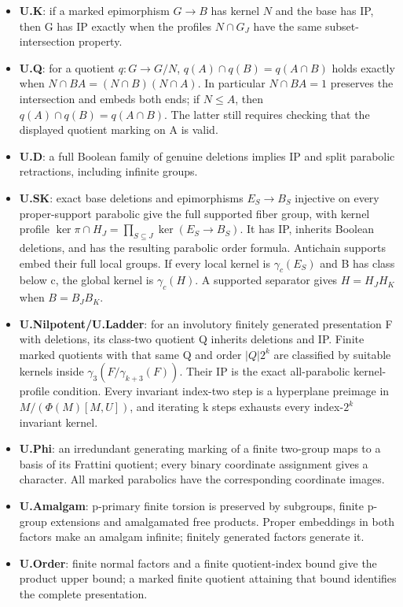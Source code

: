 \documentclass[
  11pt,
  a4paper,
]{article}
\providecommand{\tightlist}{%
  \setlength{\itemsep}{0pt}\setlength{\parskip}{0pt}}
\begin{document}
\begin{itemize}
\tightlist
\item
  \textbf{U.K}: if a marked epimorphism \(G\to B\) has kernel \(N\) and
  the base has IP, then G has IP exactly when the profiles \(N\cap G_J\)
  have the same subset-intersection property.
\item
  \textbf{U.Q}: for a quotient \(q:G\to G/N\),
  \(q(A)\cap q(B)=q(A\cap B)\) holds exactly when
  \(N\cap BA=(N\cap B)(N\cap A)\). In particular \(N\cap BA=1\)
  preserves the intersection and embeds both ends; if \(N\le A\), then
  \(q(A)\cap q(B)=q(A\cap B)\). The latter still requires checking that
  the displayed quotient marking on A is valid.
\item
  \textbf{U.D}: a full Boolean family of genuine deletions implies IP
  and split parabolic retractions, including infinite groups.
\item
  \textbf{U.SK}: exact base deletions and epimorphisms \(E_S\to B_S\)
  injective on every proper-support parabolic give the full supported
  fiber group, with kernel profile
  \(\ker\pi\cap H_J=\prod_{S\subseteq J}\ker(E_S\to B_S)\). It has IP,
  inherits Boolean deletions, and has the resulting parabolic order
  formula. Antichain supports embed their full local groups. If every
  local kernel is \(\gamma_c(E_S)\) and B has class below c, the global
  kernel is \(\gamma_c(H)\). A supported separator gives \(H=H_JH_K\)
  when \(B=B_JB_K\).
\item
  \textbf{U.Nilpotent/U.Ladder}: for an involutory finitely generated
  presentation F with deletions, its class-two quotient Q inherits
  deletions and IP. Finite marked quotients with that same Q and order
  \(|Q|2^k\) are classified by suitable kernels inside
  \(\gamma_3(F/\gamma_{k+3}(F))\). Their IP is the exact all-parabolic
  kernel-profile condition. Every invariant index-two step is a
  hyperplane preimage in \(M/(\Phi(M)[M,U])\), and iterating k steps
  exhausts every index-\(2^k\) invariant kernel.
\item
  \textbf{U.Phi}: an irredundant generating marking of a finite
  two-group maps to a basis of its Frattini quotient; every binary
  coordinate assignment gives a character. All marked parabolics have
  the corresponding coordinate images.
\item
  \textbf{U.Amalgam}: p-primary finite torsion is preserved by
  subgroups, finite p-group extensions and amalgamated free products.
  Proper embeddings in both factors make an amalgam infinite; finitely
  generated factors generate it.
\item
  \textbf{U.Order}: finite normal factors and a finite quotient-index
  bound give the product upper bound; a marked finite quotient attaining
  that bound identifies the complete presentation.
\end{itemize}
\end{document}
